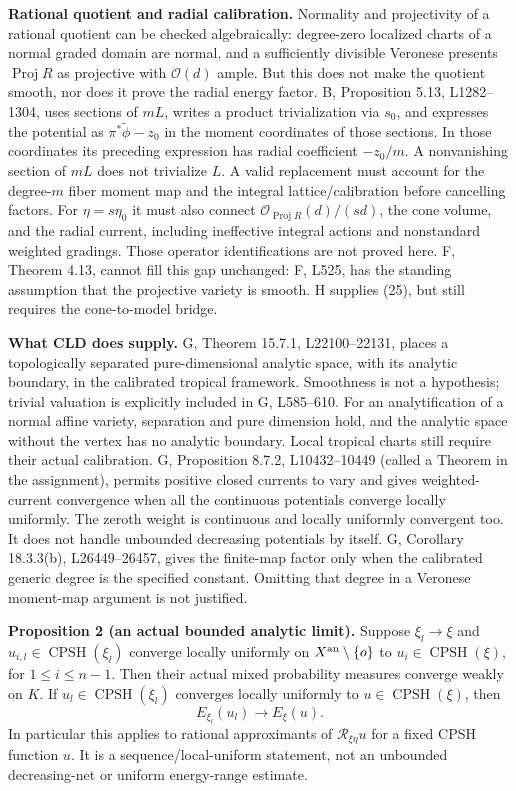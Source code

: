 \documentclass[
  11pt,
]{article}
\begin{document}
\textbf{Rational quotient and radial calibration.} Normality and
projectivity of a rational quotient can be checked algebraically:
degree-zero localized charts of a normal graded domain are normal, and a
sufficiently divisible Veronese presents \(\operatorname{Proj}R\) as
projective with \(\mathcal O(d)\) ample. But this does not make the
quotient smooth, nor does it prove the radial energy factor. B,
Proposition 5.13, L1282--1304, uses sections of \(mL\), writes a product
trivialization via \(s_0\), and expresses the potential as
\(\pi^*\widetilde\phi-z_0\) in the moment coordinates of those sections.
In those coordinates its preceding expression has radial coefficient
\(-z_0/m\). A nonvanishing section of \(mL\) does not trivialize \(L\).
A valid replacement must account for the degree-\(m\) fiber moment map
and the integral lattice/calibration before cancelling factors. For
\(\eta=s\eta_0\) it must also connect
\(\mathcal O_{\operatorname{Proj}R}(d)/(sd)\), the cone volume, and the
radial current, including ineffective integral actions and nonstandard
weighted gradings. Those operator identifications are not proved here.
F, Theorem 4.13, cannot fill this gap unchanged: F, L525, has the
standing assumption that the projective variety is smooth. H supplies
(25), but still requires the cone-to-model bridge.

\textbf{What CLD does supply.} G, Theorem 15.7.1, L22100--22131, places
a topologically separated pure-dimensional analytic space, with its
analytic boundary, in the calibrated tropical framework. Smoothness is
not a hypothesis; trivial valuation is explicitly included in G,
L585--610. For an analytification of a normal affine variety, separation
and pure dimension hold, and the analytic space without the vertex has
no analytic boundary. Local tropical charts still require their actual
calibration. G, Proposition 8.7.2, L10432--10449 (called a Theorem in
the assignment), permits positive closed currents to vary and gives
weighted-current convergence when all the continuous potentials converge
locally uniformly. The zeroth weight is continuous and locally uniformly
convergent too. It does not handle unbounded decreasing potentials by
itself. G, Corollary 18.3.3(b), L26449--26457, gives the finite-map
factor only when the calibrated generic degree is the specified
constant. Omitting that degree in a Veronese moment-map argument is not
justified.

\textbf{Proposition 2 (an actual bounded analytic limit).} Suppose
\(\xi_l\to\xi\) and \(u_{i,l}\in\operatorname{CPSH}(\xi_l)\) converge
locally uniformly on \(X^{\rm an}\setminus\{o\}\) to
\(u_i\in\operatorname{CPSH}(\xi)\), for \(1\leq i\leq n-1\). Then their
actual mixed probability measures converge weakly on \(K\). If
\(u_l\in\operatorname{CPSH}(\xi_l)\) converges locally uniformly to
\(u\in\operatorname{CPSH}(\xi)\), then \[
 E_{\xi_l}(u_l)\longrightarrow E_\xi(u).
\] In particular this applies to rational approximants of
\(\mathcal R_{\xi\eta}u\) for a fixed CPSH function \(u\). It is a
sequence/local-uniform statement, not an unbounded decreasing-net or
uniform energy-range estimate.
\end{document}
